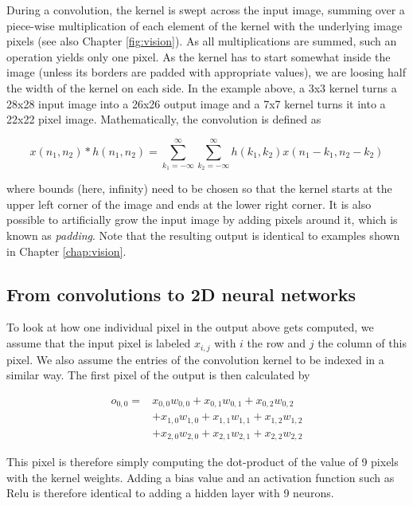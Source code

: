 During a convolution, the kernel is swept across the input image, summing over a piece-wise multiplication of each element of the kernel with the underlying image pixels (see also Chapter \ref{fig:vision}). As all multiplications are summed, such an operation yields only one pixel. As the kernel has to start somewhat inside the image (unless its borders are padded with appropriate values), we are loosing half the width of the kernel on each side. In the example above, a 3x3 kernel turns a 28x28 input image into a 26x26 output image and a 7x7 kernel turns it into a 22x22 pixel image. Mathematically, the convolution is defined as

\begin{equation}
x(n_1,n_2)*h(n_1,n_2)=\sum_{k_1=-\infty}^{\infty} \sum_{k_2=-\infty}^{\infty} h(k_1,k_2)x(n_1-k_1,n_2-k_2)
\end{equation}

where bounds (here, infinity) need to be chosen so that the kernel starts at the upper left corner of the image and ends at the lower right corner. It is also possible to artificially grow the input image by adding pixels around it, which is known as \emph{padding}. Note that the resulting output is identical to examples shown in Chapter \ref{chap:vision}.

\subsection{From convolutions to 2D neural networks}

To look at how one individual pixel in the output above gets computed, we assume that the input pixel is labeled $x_{i,j}$ with $i$ the row and $j$ the column of this pixel. We also assume the entries of the convolution kernel to be indexed in a similar way. The first pixel of the output is then calculated by

\begin{eqnarray}
o_{0,0}=&x_{0,0}w_{0,0}+x_{0,1}w_{0,1}+x_{0,2}w_{0,2}\\
\nonumber
		&+x_{1,0}w_{1,0}+x_{1,1}w_{1,1}+x_{1,2}w_{1,2}\\
\nonumber
		&+x_{2,0}w_{2,0}+x_{2,1}w_{2,1}+x_{2,2}w_{2,2}
\end{eqnarray}

This pixel is therefore simply computing the dot-product of the value of 9 pixels with the kernel weights. Adding a bias value and an activation function such as Relu is therefore identical to adding a hidden layer with 9 neurons. 


